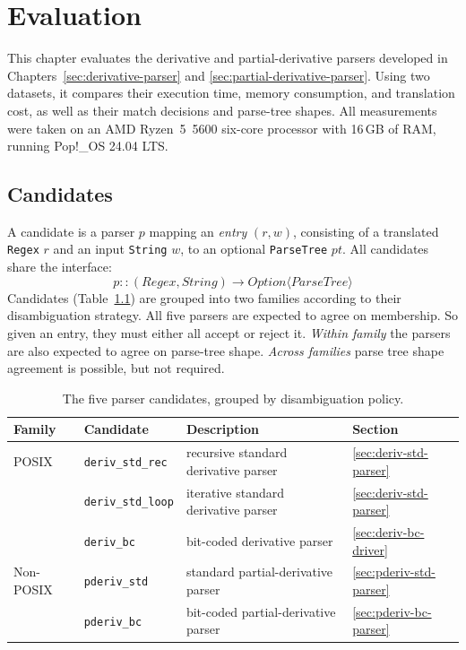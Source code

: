 \chapter{Evaluation}
\label{sec:evaluation}

This chapter evaluates the derivative and partial-derivative parsers
developed in Chapters~\ref{sec:derivative-parser} 
and \ref{sec:partial-derivative-parser}. 
Using two datasets, 
it compares their execution time, memory consumption, and translation cost, 
as well as their match decisions and parse-tree shapes. 
All measurements were taken on an AMD Ryzen~5~5600 six-core processor
with 16\,GB of RAM, running Pop!\_OS 24.04 LTS.

%
%
%

\section{Candidates}
\label{sec:eval-candidates}

A candidate is a parser $p$ mapping an \emph{entry} $(r,w)$, 
consisting of a translated \texttt{Regex} $r$ 
and an input \texttt{String} $w$, 
to an optional \texttt{ParseTree} $pt$. 
All candidates share the interface:
\[
p :: (\mathit{Regex}, \mathit{String}) \to
     \mathit{Option\langle ParseTree\rangle}
\]
Candidates (Table~\ref{tab:eval-candidates})
are grouped into two families according 
to their disambiguation strategy.
All five parsers are expected to agree on membership.
So given an entry, they must either all accept or reject it.
\emph{Within family} the parsers are also expected to agree on parse-tree shape.
\emph{Across families} parse tree shape agreement is possible, but not required.

\begin{table}[H]
\centering
\small
\setlength{\tabcolsep}{4pt}
\begin{tabular*}{\textwidth}{@{\extracolsep{\fill}} llll}
\hline
Family & Candidate & Description & Section \\
\hline
POSIX     & \texttt{deriv\_std\_rec}  & recursive standard derivative parser
          & \ref{sec:deriv-std-parser} \\
          & \texttt{deriv\_std\_loop} & iterative standard derivative parser
          & \ref{sec:deriv-std-parser} \\
          & \texttt{deriv\_bc}        & bit-coded derivative parser
          & \ref{sec:deriv-bc-driver} \\
\hline
Non-POSIX & \texttt{pderiv\_std}      & standard partial-derivative parser
          & \ref{sec:pderiv-std-parser} \\
          & \texttt{pderiv\_bc}       & bit-coded partial-derivative parser
          & \ref{sec:pderiv-bc-parser} \\
\hline
\end{tabular*}
\caption{The five parser candidates, grouped by disambiguation policy.}
\label{tab:eval-candidates}
\end{table}

